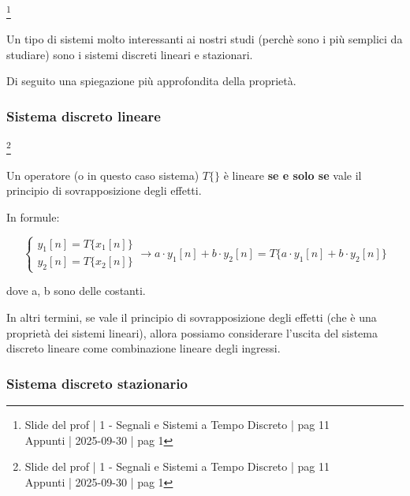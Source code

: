 \footnote{ 
    Slide del prof | 1 - Segnali e Sistemi a Tempo Discreto | pag 11\\
    Appunti | 2025-09-30 | pag 1
}

Un tipo di sistemi molto interessanti ai nostri studi (perchè sono i più semplici da studiare) 
sono i sistemi discreti lineari e stazionari. \newline 

Di seguito una spiegazione più approfondita della proprietà. \newline 

\newpage 

\subsubsection{Sistema discreto lineare}

\footnote{ 
    Slide del prof | 1 - Segnali e Sistemi a Tempo Discreto | pag 11\\
    Appunti | 2025-09-30 | pag 1
}

Un operatore (o in questo caso sistema) $T \{ \}$ è lineare \textbf{se e solo se} vale il principio di sovrapposizione degli effetti. \newline 

In formule: 

{
    \Large 
    \begin{equation}
        \begin{cases}
        y_1 \left[ n \right]
        = 
        T \{ x_1 \left[ n\right]\}
        \\
        y_2 \left[ n \right]
        = 
        T \{ x_2 \left[ n\right]\}
        \end{cases}        
        \to 
        a \cdot y_1 \left[ n\right]
        + 
        b \cdot y_2 \left[ n\right]
        = 
        T 
        \{ 
        a \cdot y_1 \left[ n\right]
        + 
        b \cdot y_2 \left[ n\right]
        \}
    \end{equation}
}

dove a, b sono delle costanti. \newline 

In altri termini, se vale il principio di sovrapposizione degli effetti (che è una proprietà dei sistemi lineari), 
allora possiamo considerare l'uscita del sistema discreto lineare come combinazione lineare degli ingressi. \newline 

\newpage 

\subsubsection{Sistema discreto stazionario}

